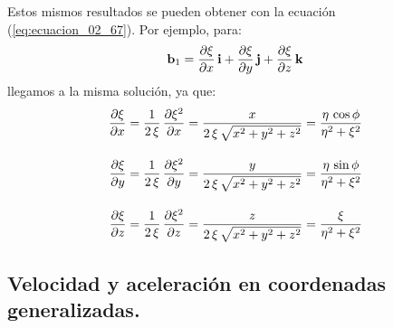 \documentclass[12pt]{article}
\begin{document}
Estos mismos resultados se pueden obtener con la ecuación (\ref{eq:ecuacion_02_67}). Por ejemplo, para:
\begin{align*}
    \vb{b}_{1} = \pdv{\xi}{x} \, \vb{i} + \pdv{\xi}{y} \, \vb{j} + \pdv{\xi}{z} \, \vb{k}
\end{align*} 
llegamos a la misma solución, ya que:
\begin{align*}
    \pdv{\xi}{x} &= \dfrac{1}{2 \, \xi} \, \pdv{\xi^{2}}{x} = \dfrac{x}{2 \, \xi \, \sqrt{x^{2} + y^{2} + z^{2}}} = \dfrac{\eta \, \cos \phi}{\eta^{2} + \xi^{2}} \\[1em]
    \pdv{\xi}{y} &= \dfrac{1}{2 \, \xi} \, \pdv{\xi^{2}}{y} = \dfrac{y}{2 \, \xi \, \sqrt{x^{2} + y^{2} + z^{2}}} = \dfrac{\eta \, \sin \phi}{\eta^{2} + \xi^{2}} \\[1em]
    \pdv{\xi}{z} &= \dfrac{1}{2 \, \xi} \, \pdv{\xi^{2}}{z} = \dfrac{z}{2 \, \xi \, \sqrt{x^{2} + y^{2} + z^{2}}} = \dfrac{\xi}{\eta^{2} + \xi^{2}}
\end{align*}

\subsection{Velocidad y aceleración en coordenadas generalizadas.}
\end{document}
